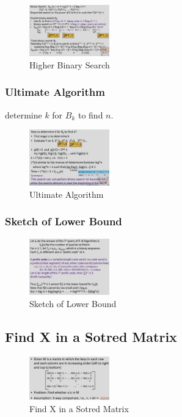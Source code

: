 \begin{figure}[H]
    \centering
    \includegraphics[width=0.309\textwidth]{pic/DAA4/Higher Binary Search}
    \caption{Higher Binary Search}
\end{figure}


\subsubsection{Ultimate Algorithm}
determine $k$ for $B_k$ to find $n$.

\begin{figure}[H]
    \centering
    \includegraphics[width=0.309\textwidth]{pic/DAA4/Ultimate Algorithm}
    \caption{Ultimate Algorithm}
\end{figure}


\subsubsection{Sketch of Lower Bound}
\begin{figure}[H]
    \centering
    \includegraphics[width=0.309\textwidth]{pic/DAA4/Sketch of Lower Bound}
    \caption{Sketch of Lower Bound}
\end{figure}

\subsection{Find X in a Sotred Matrix}
\begin{figure}[H]
    \centering
    \includegraphics[width=0.309\textwidth]{pic/DAA4/Find X in a Sotred Matrix}
    \caption{Find X in a Sotred Matrix}
\end{figure}

